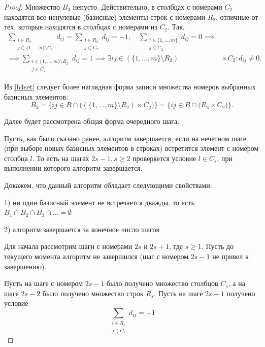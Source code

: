 \documentclass[12pt]{article}
\theoremstyle{definition}
\theoremstyle{plain}
\theoremstyle{definition}
\begin{document}
\begin{proof}
Множество $B_4$ непусто. Действительно, в столбцах с номерами $C_2$ находятся
все ненулевые (базисные) элементы строк с номерами $R_2$, отличные от тех,
которые находятся в столбцах с номерами из $C_1$. Так,
\begin{equation}\label{b4set}
\begin{aligned}
\sum_{\substack{i \in R_2 \\ j \in \{1,\dots,n\} \setminus C_1}} d_{ij} =
\sum_{\substack{i \in R_2 \\ j \in C_2}} d_{ij} = -1,
\quad \sum_{\substack{i \in \{1,\dots,m\} \\ j \in C_2}} d_{ij} = 0 \implies &\\
\implies
\sum_{\substack{i \in \{1,\dots,m\} \setminus R_2 \\ j \in C_2}} d_{ij} = 1
\implies \exists ij \in (\{1,\dots,m\} \setminus R_2) & \times C_2: d_{ij} \neq 0.
\end{aligned}
\end{equation}

Из \eqref{b4set} следует более наглядная форма записи множества
номеров выбранных базисных элементов:
\[
B_4 = \{ij \in B \cap \bigl((\{1,\dots,m\} \setminus R_2) \times C_2\bigr) \}
= \{ij \in B \cap \bigl(R_3 \times C_2\bigr) \}.
\]

Далее будет рассмотрена общая форма очередного шага.

Пусть, как было сказано ранее, алгоритм завершается, если на нечетном
шаге (при выборе новых базисных элементов в строках) встретится элемент с номером
столбца $l$. То есть на шагах $2s - 1, s \geq 2$ проверяется условие
$l \in C_s$, при выполнении которого алгоритм завершается.

Докажем, что данный алгоритм обладает следующими свойствами:

1) ни один базисный элемент не встречается дважды, то есть
$B_1 \cap B_2 \cap B_3 \cap \dots = \emptyset$

2) алгоритм завершается за конечное число шагов

Для начала рассмотрим шаги с номерами $2s$ и $2s + 1$, где $s \geq 1$.
Пусть до текущего момента алгоритм не завершился (шаг с номером $2s - 1$
не привел к завершению).

Пусть на шаге с номером $2s - 1$ было получено множество столбцов $C_s$, а
на шаге $2s - 2$ было получено множество строк $R_s$. Пусть на шаге $2s - 1$
получено условие
\begin{equation}\label{stepcol}
\sum_{\substack{i \in R_s \\ j \in C_s}} d_{ij} = -1
\end{equation}


\end{proof}
\end{document}
